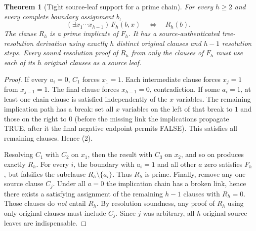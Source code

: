 \documentclass[11pt]{article}
\newtheorem{theorem}{Theorem}
\begin{document}
\begin{theorem}[Tight source-leaf support for a prime chain]
For every $h\ge2$ and every complete boundary assignment $b$,
\[
 (\exists x_1\cdots x_{h-1})\,F_h(b,x)
 \quad\Longleftrightarrow\quad R_h(b).
 \tag{2}
\]
The clause $R_h$ is a prime implicate of $F_h$.
It has a source-authenticated tree-resolution derivation using exactly
$h$ \emph{distinct} original clauses and $h-1$ resolution steps.
Every sound resolution proof of $R_h$ from \emph{only the clauses of}
$F_h$ must use each of its $h$ original clauses as a source leaf.
\end{theorem}
\begin{proof}
If every $a_i=0$, $C_1$ forces $x_1=1$.
Each intermediate clause forces $x_{j}=1$ from $x_{j-1}=1$.
The final clause forces $x_{h-1}=0$, contradiction.
If some $a_i=1$, at least one chain clause is satisfied independently
of the $x$ variables. The remaining implication path has a break:
set all $x$ variables on the left of that break to $1$ and those on the
right to $0$ (before the missing link the implications propagate TRUE,
after it the final negative endpoint permits FALSE). This satisfies all remaining clauses. Hence (2).

Resolving $C_1$ with $C_2$ on $x_1$, then the result with $C_3$
on $x_2$, and so on produces exactly $R_h$. For every $i$,
the boundary with $a_i=1$ and all other $a$ zero satisfies $F_h$,
but falsifies the subclause $R_h\setminus\{a_i\}$.
Thus $R_h$ is prime. Finally, remove any one source clause $C_j$.
Under all $a=0$ the implication chain has a broken link, hence
there exists a satisfying assignment of the remaining $h-1$ clauses
with $R_h=0$. Those clauses do \emph{not} entail $R_h$.
By resolution soundness, any proof of $R_h$ using only original
clauses must include $C_j$. Since $j$ was arbitrary, all $h$
original source leaves are indispensable.
\end{proof}
\end{document}

